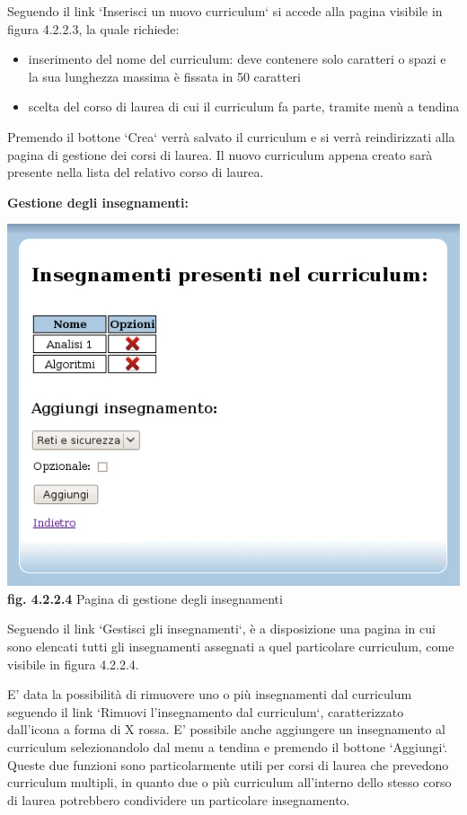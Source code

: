 \documentclass[11pt,a4paper]{article}
\begin{document}
Seguendo il link `Inserisci un nuovo curriculum` si accede alla pagina visibile in figura 4.2.2.3, la quale richiede:
\begin{itemize}
 \item inserimento del nome del curriculum: deve contenere solo caratteri o spazi e la sua lunghezza massima è fissata in 50 caratteri
 \item scelta del corso di laurea di cui il curriculum fa parte, tramite menù a tendina
\end{itemize}
Premendo il bottone `Crea` verrà salvato il curriculum e si verrà reindirizzati alla pagina di gestione dei corsi di laurea. Il nuovo curriculum appena creato sarà presente nella lista del relativo corso di laurea.
\newpage
\begin{large}\textbf{Gestione degli insegnamenti:}\end{large}

\bigskip
\begin{center}
	\includegraphics[scale=0.5]{images/gestisci_insegnamenti.jpg}\\
	\textbf{fig. 4.2.2.4} Pagina di gestione degli insegnamenti\\
\end{center}
\bigskip

Seguendo il link `Gestisci gli insegnamenti`, è a disposizione una pagina in cui sono elencati tutti gli insegnamenti assegnati a quel particolare curriculum, come visibile in figura 4.2.2.4.

E' data la possibilità di rimuovere uno o più insegnamenti dal curriculum seguendo il link `Rimuovi l'insegnamento dal curriculum`, caratterizzato dall'icona a forma di X rossa.
E' possibile anche aggiungere un insegnamento al curriculum selezionandolo dal menu a tendina e premendo il bottone `Aggiungi`.
Queste due funzioni sono particolarmente utili per corsi di laurea che prevedono curriculum multipli, in quanto due o più curriculum all'interno dello stesso corso di laurea potrebbero condividere un particolare insegnamento.
\end{document}
